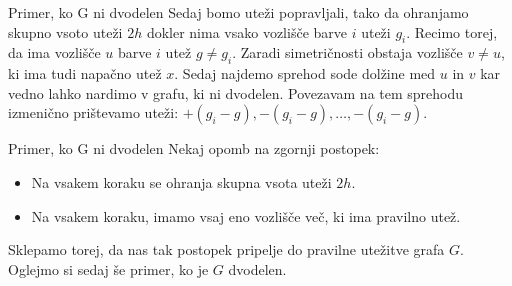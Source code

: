 \documentclass{beamer}
\begin{document}
\begin{frame}{Primer, ko G ni dvodelen}
	Sedaj bomo uteži popravljali, tako da ohranjamo skupno vsoto uteži $2h$ dokler nima vsako vozlišče barve $i$ uteži $g_i$. Recimo torej, da ima vozlišče $u$ barve $i$ utež $g \neq g_i$. Zaradi simetričnosti obstaja vozlišče $v \neq u$, ki ima tudi napačno utež $x$. Sedaj najdemo sprehod sode dolžine med $u$ in $v$ kar vedno lahko nardimo v grafu, ki ni dvodelen. Povezavam na tem sprehodu izmenično prištevamo uteži: $ +(g_i - g), - (g_i - g), \ldots, -(g_i - g)$.
	\begin{figure}
	\end{figure}
\end{frame}

\begin{frame}{Primer, ko G ni dvodelen}
	Nekaj opomb na zgornji postopek:
	\begin{itemize}
		\item Na vsakem koraku se ohranja skupna vsota uteži $2h$.
		\item Na vsakem koraku, imamo vsaj eno vozlišče več, ki ima pravilno utež.
	\end{itemize}

	Sklepamo torej, da nas tak postopek pripelje do pravilne utežitve grafa $G$. Oglejmo si sedaj še primer, ko je $G$ dvodelen.
\end{frame}
\end{document}
